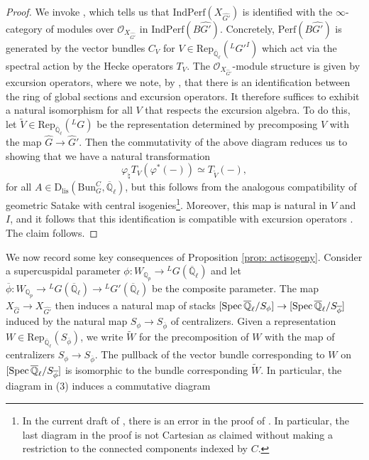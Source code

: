 \documentclass[reqno,11pt]{amsart}
\theoremstyle{remark}
\def\Spec{\mathop{\rm Spec}}
\newcommand{\Bun}{\mathrm{Bun}}
\newcommand{\Rep}{\mathrm{Rep}}
\newcommand{\Dlis}{\mathrm{D}_{\mathrm{lis}}}
\newcommand{\Perf}{\mathrm{Perf}}
\newcommand{\IndPerf}{\mathrm{IndPerf}}
\def\ol{\overline}
\def\ra{\rightarrow}
\begin{document}
\begin{proof}
We invoke \cite[Theorem~VIII.5.1]{FS}, which tells us that $\IndPerf(X_{\hat{G'}})$ is identified with the $\infty$-category of modules over $\mathcal{O}_{X_{\hat{G'}}}$ in $\IndPerf(B\hat{G'})$. Concretely, $\Perf(B\hat{G'})$ is generated by the vector bundles $C_{V}$ for $V \in \Rep_{\ol{\mathbb{Q}}_{\ell}}(\phantom{}^{L}G'^{I})$ which act via the spectral action by the Hecke operators $T_{V}$. The $\mathcal{O}_{X_{\hat{G}'}}$-module structure is given by excursion operators, where we note, by \cite[Theorem~VIII.3.6]{FS}, that there is an identification between the ring of global sections and excursion operators. It therefore suffices to exhibit a natural isomorphism for all $V$ that respects the excursion algebra. To do this, let $\widetilde{V} \in \Rep_{\ol{\mathbb{Q}}_{\ell}}(\phantom{}^{L}G)$ be the representation determined by precomposing $V$ with the map $\hat{G} \ra \hat{G}'$. Then the commutativity of the above diagram reduces us to showing that we have a natural transformation 
\[ \varphi_{\natural}T_{V}(\varphi^{*}(-)) \simeq T_{\widetilde{V}}(-),   \]
for all $A \in \Dlis(\Bun_{G}^{C},\ol{\mathbb{Q}}_{\ell})$, but this follows from the analogous compatibility of geometric Satake with central isogenies\footnote{In the current draft of \cite{FS}, there is an error in the proof of \cite[Theorem~IX.6.1]{FS}. In particular, the last diagram in the proof is not Cartesian as claimed without making a restriction to the connected components indexed by $C$.}. Moreover, this map is natural in $V$ and $I$, and it follows that this identification is compatible with excursion operators \cite[Theorem~IX.6.1]{FS}. The claim follows.
\end{proof}
We now record some key consequences of Proposition \ref{prop: actisogeny}. Consider a supercuspidal parameter $\phi: W_{\mathbb{Q}_{p}} \ra \phantom{}^{L}G(\ol{\mathbb{Q}}_{\ell})$ and let $\ol{\phi}:  W_{\mathbb{Q}_{p}} \ra \phantom{}^{L}G(\ol{\mathbb{Q}}_{\ell}) \ra \phantom{}^{L}G'(\ol{\mathbb{Q}}_{\ell})$ be the composite parameter. The map $X_{\hat{G}} \ra X_{\hat{G'}}$ then induces a natural map of stacks $[\Spec{\ol{\mathbb{Q}}_{\ell}}/S_{\phi}] \ra [\Spec{\ol{\mathbb{Q}}_{\ell}}/S_{\ol{\phi}}]$ induced by the natural map $S_{\phi} \ra S_{\ol{\phi}}$ of centralizers. Given a representation $W \in \Rep_{\ol{\mathbb{Q}}_{\ell}}(S_{\ol{\phi}})$, we write $\widetilde{W}$ for the precomposition of $W$ with the map of centralizers $S_{\phi} \ra S_{\ol{\phi}}$. The pullback of the vector bundle corresponding to $W$ on $[\Spec{\ol{\mathbb{Q}}_{\ell}}/S_{\ol{\phi}}]$ is isomorphic to the bundle corresponding $\widetilde{W}$. In particular, the diagram in (3) induces a commutative diagram 
\end{document}
